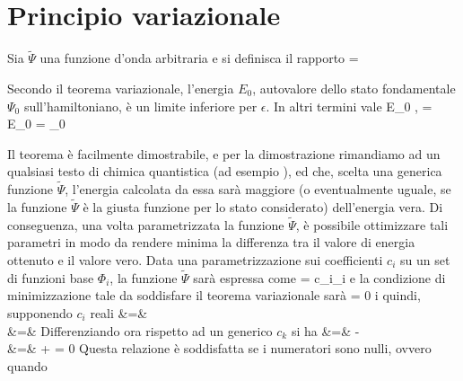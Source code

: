 \section{Principio variazionale}

Sia $\tilde{\Psi}$ una funzione d'onda arbitraria e si definisca il rapporto
\beq
\label{eqn:varia1}
\epsilon = \frac{\braket{\tilde{\Psi}}{\ham}{\tilde{\Psi}}}{\integral{\tilde{\Psi}}{\tilde{\Psi}}}
\eeq

Secondo il teorema variazionale, l'energia $E_0$, autovalore dello stato fondamentale $\Psi_0$ sull'hamiltoniano,
\`e un limite inferiore per $\epsilon$. In altri termini vale
\beq
\epsilon \ge E_0 \quad \forall \tilde{\Psi} \quad \mbox{,} \quad \epsilon = E_0 \Leftrightarrow
\tilde{\Psi} = \Psi_{0}
\eeq

Il teorema \`e facilmente dimostrabile, e per la dimostrazione rimandiamo ad
un qualsiasi testo di chimica quantistica (ad esempio \cite{szabo-mqc}), ed
che, scelta una generica funzione $\tilde{\Psi}$, l'energia calcolata
da essa sar\`a maggiore (o eventualmente uguale, se la funzione $\tilde{\Psi}$ \`e la giusta funzione
per lo stato considerato) dell'energia vera.
Di conseguenza, una volta parametrizzata la funzione $\tilde{\Psi}$, \`e possibile ottimizzare tali
parametri in modo da rendere minima la differenza tra il valore di energia ottenuto e il valore vero.
Data una parametrizzazione sui coefficienti $c_i$ su un set di funzioni base $\Phi_i$, la funzione
$\tilde{\Psi}$ sar\`a espressa come 
\beq
\label{eqn:varia1_1}
\tilde{\Psi} = c_i\Phi_i
\eeq
e la condizione di minimizzazione tale da soddisfare il teorema variazionale sar\`a
\beq
{} = 0 \quad \forall i
\eeq
quindi, supponendo $c_i$ reali
\beqa
\epsilon &=&  \nonumber \\
&=& 
\eeqa
Differenziando ora rispetto ad un generico $c_k$ si ha
\beqa
{} &=&  -  \nonumber \\
&=&  +  = 0
\eeqa
Questa relazione \`e soddisfatta se i numeratori sono nulli, ovvero quando
